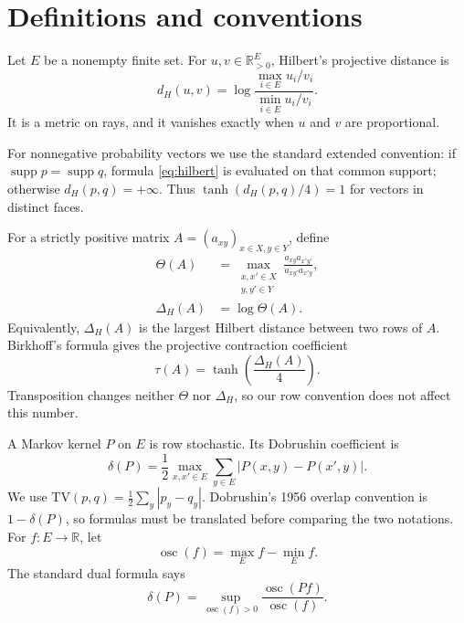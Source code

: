 \documentclass[11pt]{article}
\newcommand{\TV}{\mathrm{TV}}
\newcommand{\osc}{\operatorname{osc}}
\newcommand{\diamH}{\Delta_{H}}
\newcommand{\R}{\mathbb{R}}
\newcommand{\1}{\mathbf{1}}
\begin{document}
\section{Definitions and conventions}

Let $E$ be a nonempty finite set.  For $u,v\in\R^E_{>0}$, Hilbert's
projective distance is
\begin{equation}\label{eq:hilbert}
 d_H(u,v)=\log\frac{\max_{i\in E}u_i/v_i}
                        {\min_{i\in E}u_i/v_i}.
\end{equation}
It is a metric on rays, and it vanishes exactly when $u$ and $v$ are
proportional.

For nonnegative probability vectors we use the standard extended convention:
if $\operatorname{supp}p=\operatorname{supp}q$, formula
\eqref{eq:hilbert} is evaluated on that common
support; otherwise $d_H(p,q)=+\infty$.  Thus
$\tanh(d_H(p,q)/4)=1$ for vectors in distinct faces.

For a strictly positive matrix $A=(a_{xy})_{x\in X,y\in Y}$, define
\begin{align}
 \Theta(A)&=\max_{\substack{x,x'\in X\\ y,y'\in Y}}
 \frac{a_{xy}a_{x'y'}}{a_{xy'}a_{x'y}},\label{eq:theta}\\
 \diamH(A)&=\log\Theta(A).
\end{align}
Equivalently, $\diamH(A)$ is the largest Hilbert distance between two rows
of $A$.  Birkhoff's formula gives the projective contraction coefficient
\begin{equation}\label{eq:birkhoff}
 \tau(A)=\tanh\!\left(\frac{\diamH(A)}4\right).
\end{equation}
Transposition changes neither $\Theta$ nor $\diamH$, so our row convention
does not affect this number.

A Markov kernel $P$ on $E$ is row stochastic.  Its Dobrushin coefficient is
\begin{equation}\label{eq:dobrushin}
 \delta(P)=\frac12\max_{x,x'\in E}
             \sum_{y\in E}|P(x,y)-P(x',y)|.
\end{equation}
We use $\TV(p,q)=\frac12\sum_y|p_y-q_y|$.  Dobrushin's 1956 overlap
convention is $1-\delta(P)$, so formulas must be translated before comparing
the two notations.  For $f:E\to\R$, let
\[
 \osc(f)=\max_E f-\min_E f.
\]
The standard dual formula says
\begin{equation}\label{eq:osc-exact}
 \delta(P)=\sup_{\osc(f)>0}\frac{\osc(Pf)}{\osc(f)}.
\end{equation}
\end{document}
